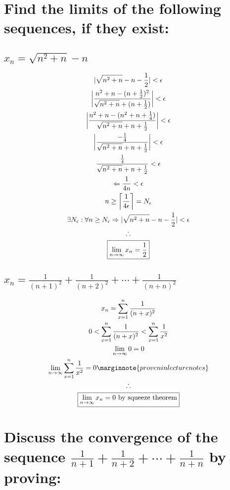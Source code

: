 \documentclass[letterpaper]{article}
\DeclarePairedDelimiter{\ceil}{\lceil}{\rceil}
\DeclarePairedDelimiter\abs{\lvert}{\rvert}
\begin{document}
\section{Find the limits of the following sequences, if they exist:}
\subsection{$x_n=\sqrt{n^2+n}-n$}
\begin{gather*}
\abs{\sqrt{n^2+n}-n-\frac{1}{2}}<\epsilon \\
\abs[\bigg]{\frac{n^2+n-(n+\frac{1}{2})^2}{\sqrt{n^2+n}+(n+\frac{1}{2})}}<\epsilon \\
\abs[\bigg]{\frac{n^2+n-(n^2+n+\frac{1}{4})}{\sqrt{n^2+n}+n+\frac{1}{2}}}<\epsilon \\
\abs[\bigg]{\frac{-\frac{1}{4}}{\sqrt{n^2+n}+n+\frac{1}{2}}}<\epsilon \\
\frac{\frac{1}{4}}{\sqrt{n^2+n}+n+\frac{1}{2}}<\epsilon \\
\Leftarrow\frac{1}{4n}<\epsilon \\
n\geq\ceil[\bigg]{\frac{1}{4\epsilon}}=N_\epsilon \\
\exists N_\epsilon:\forall n\geq N_\epsilon\Rightarrow\abs{\sqrt{n^2+n}-n-\frac{1}{2}}<\epsilon \\
\therefore \\
\boxed{\lim_{n\rightarrow\infty}x_n=\frac{1}{2}}
\end{gather*}
\subsection{$x_n=\frac{1}{(n+1)^2}+\frac{1}{(n+2)^2}+\dotsb+\frac{1}{(n+n)^2}$}
\begin{gather*}
x_n=\sum_{x=1}^{n}\frac{1}{(n+x)^2} \\
0<\sum_{x=1}^{n}\frac{1}{(n+x)^2}<\sum_{x=1}^{n}\frac{1}{x^2}\\
\lim_{n\rightarrow\infty}0=0 \\
\lim_{n\rightarrow\infty}\sum_{x=1}^{n}\frac{1}{x^2}=0 \marginnote{proven in lecture notes} \\
\therefore \\
\boxed{\lim_{n\rightarrow\infty}x_n=0\text{ by squeeze theorem}}
\end{gather*}

\section{Discuss the convergence of the sequence $\frac{1}{n+1}+\frac{1}{n+2}+\dotsb+\frac{1}{n+n}$ by proving:}
\end{document}
